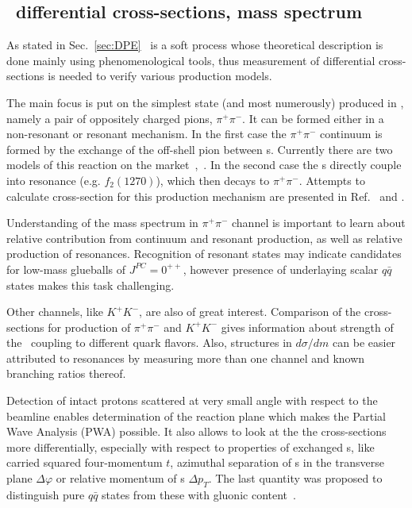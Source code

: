 \subsection{\DPE\ differential cross-sections, mass spectrum}

As stated in Sec.~\ref{sec:DPE} \DPE\ is a soft process whose theoretical description is done mainly using phenomenological tools, thus measurement of differential cross-sections is needed to verify various production models.

The main focus is put on the simplest state (and most numerously) produced in \DPE, namely a pair of oppositely charged pions, $\pi^{+}\pi^{-}$. It can be formed either in a non-resonant or resonant mechanism. In the first case the $\pi^{+}\pi^{-}$ continuum is formed by the exchange of the off-shell pion between \Pomeron s. Currently there are two models of this reaction on the market~\cite{LSmodel,LSmodel2},~\cite{DurhamModel}. In the second case the \Pomeron s directly couple into resonance (e.g. $f_{2}(1270)$), which then decays to $\pi^{+}\pi^{-}$. Attempts to calculate cross-section for this production mechanism are presented in Ref.~\cite{LSmodel2} and \cite{Schicker}.

Understanding of the mass spectrum in $\pi^{+}\pi^{-}$ channel is important to learn about relative contribution from continuum and resonant production, as well as relative production of resonances. Recognition of resonant states may indicate candidates for low-mass glueballs of $J^{PC}=0^{++}$, however presence of underlaying scalar $q\bar{q}$ states makes this task challenging.

Other channels, like $K^{+}K^{-}$, are also of great interest. Comparison of the cross-sections for production of $\pi^{+}\pi^{-}$ and $K^{+}K^{-}$ gives information about strength of the \Pomeron\ coupling to different quark flavors. Also, structures in $d\sigma/dm$ can be easier attributed to resonances by measuring more than one channel and known branching ratios thereof.

Detection of intact protons scattered at very small angle with respect to the beamline enables determination of the reaction plane which makes the Partial Wave Analysis (PWA) possible. It also allows to look at the the cross-sections more differentially, especially with respect to properties of exchanged \Pomeron s, like carried squared four-momentum $t$, azimuthal separation of \Pomeron s in the transverse plane $\Delta\varphi$ or relative momentum of \Pomeron s $\Delta p_{T}$. The last quantity was proposed to distinguish pure $q\bar{q}$ states from these with gluonic content~\cite{DPtFilter}.

